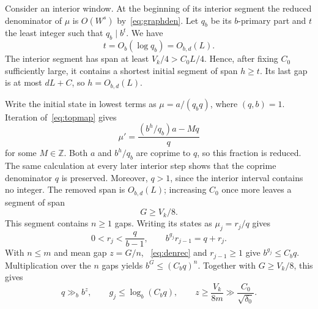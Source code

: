 \documentclass[10pt,a4paper]{amsart}
\newcommand{\Z}{\mathbb Z}
\begin{document}
Consider an interior window. At the beginning of its interior segment the
reduced denominator of $\mu$ is $O(W^s)$ by~\eqref{eq:graphden}. Let $q_b$
be its $b$-primary part and $t$ the least integer such that $q_b\mid b^t$.
We have
\[
 t=O_b(\log q_b)=O_{b,d}(L).
\]
The interior segment has span at least $V_k/4>C_0L/4$. Hence, after fixing
$C_0$ sufficiently large, it contains a shortest initial segment of span
$h\ge t$. Its last gap is at most $dL+C$, so $h=O_{b,d}(L)$.

Write the initial state in lowest terms as $\mu=a/(q_bq)$, where $(q,b)=1$.
Iteration of~\eqref{eq:topmap} gives
\[
 \mu'=\frac{(b^h/q_b)a-Mq}{q}
\]
for some $M\in\Z$. Both $a$ and $b^h/q_b$ are coprime to $q$, so this fraction
is reduced. The same calculation at every later interior step shows that the
coprime denominator $q$ is preserved. Moreover, $q>1$, since the interior
interval contains no integer. The removed span is $O_{b,d}(L)$; increasing
$C_0$ once more leaves a segment of span
\[
 G\ge V_k/8.
\]
This segment contains $n\ge1$ gaps.
Writing its states as $\mu_j=r_j/q$ gives
\begin{equation}\label{eq:denrec}
 0<r_j<\frac q{b-1},\qquad
 b^{g_j}r_{j-1}=q+r_j.
\end{equation}
With $n\le m$ and mean gap $z=G/n$,
~\eqref{eq:denrec} and $r_{j-1}\ge1$ give $b^{g_j}\le C_bq$.
Multiplication over the $n$ gaps yields $b^G\le(C_bq)^n$. Together with
$G\ge V_k/8$, this gives
\begin{equation}\label{eq:qz}
 q\gg_b b^z,\qquad g_j\le\log_b(C_bq),\qquad
 z\ge\frac{V_k}{8m}\gg\frac{C_0}{\sqrt{\delta_0}}.
\end{equation}
\end{document}
